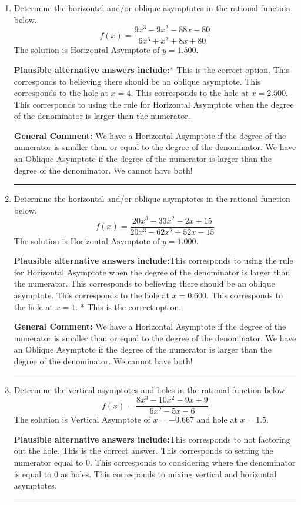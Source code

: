 \documentclass{extbook}[14pt]
\newcommand{\litem}[1]{\item #1

\rule{\textwidth}{0.4pt}}
\begin{document}
\begin{enumerate}\litem{
Determine the horizontal and/or oblique asymptotes in the rational function below.
\[ f(x) = \frac{9x^{3} -9 x^{2} -88 x -80}{6x^{3} + x^{2} +8 x + 80} \]The solution is \( \text{Horizontal Asymptote of } y = 1.500  \).\begin{enumerate}[label=\Alph*.]
\textbf{Plausible alternative answers include:}* This is the correct option.
This corresponds to believing there should be an oblique asymptote.
This corresponds to the hole at $x = 4$.
This corresponds to the hole at $x = 2.500$.
This corresponds to using the rule for Horizontal Asymptote when the degree of the denominator is larger than the numerator.
\end{enumerate}

\textbf{General Comment:} We have a Horizontal Asymptote if the degree of the numerator is smaller than or equal to the degree of the denominator. We have an Oblique Asymptote if the degree of the numerator is larger than the degree of the denominator. We cannot have both!
}
\litem{
Determine the horizontal and/or oblique asymptotes in the rational function below.
\[ f(x) = \frac{20x^{3} -33 x^{2} -2 x + 15}{20x^{3} -62 x^{2} +52 x -15} \]The solution is \( \text{Horizontal Asymptote of } y = 1.000  \).\begin{enumerate}[label=\Alph*.]
\textbf{Plausible alternative answers include:}This corresponds to using the rule for Horizontal Asymptote when the degree of the denominator is larger than the numerator.
This corresponds to believing there should be an oblique asymptote.
This corresponds to the hole at $x = 0.600$.
This corresponds to the hole at $x = 1$.
* This is the correct option.
\end{enumerate}

\textbf{General Comment:} We have a Horizontal Asymptote if the degree of the numerator is smaller than or equal to the degree of the denominator. We have an Oblique Asymptote if the degree of the numerator is larger than the degree of the denominator. We cannot have both!
}
\litem{
Determine the vertical asymptotes and holes in the rational function below.
\[ f(x) = \frac{8x^{3} -10 x^{2} -9 x + 9}{6x^{2} -5 x -6} \]The solution is \( \text{Vertical Asymptote of } x = -0.667 \text{ and hole at } x = 1.5 \).\begin{enumerate}[label=\Alph*.]
\textbf{Plausible alternative answers include:}This corresponds to not factoring out the hole.
This is the correct answer.
This corresponds to setting the numerator equal to 0.
This corresponds to considering where the denominator is equal to 0 as holes.
This corresponds to mixing vertical and horizontal asymptotes.
\end{enumerate}

}
\end{enumerate}
\end{document}
